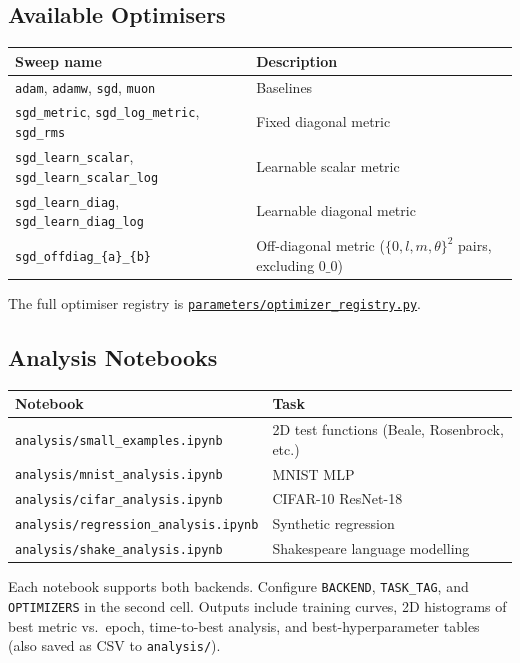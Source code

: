 \documentclass{article}
\begin{document}
\begin{appendices}
\subsection{Available Optimisers}
\begin{center}
\footnotesize
\begin{tabular}{@{}lp{6cm}@{}}
    \toprule
    \textbf{Sweep name} & \textbf{Description} \\
    \midrule
    \texttt{adam}, \texttt{adamw}, \texttt{sgd}, \texttt{muon} & Baselines \\
    \texttt{sgd\_metric}, \texttt{sgd\_log\_metric}, \texttt{sgd\_rms} & Fixed diagonal metric \\
    \texttt{sgd\_learn\_scalar}, \texttt{sgd\_learn\_scalar\_log} & Learnable scalar metric \\
    \texttt{sgd\_learn\_diag}, \texttt{sgd\_learn\_diag\_log} & Learnable diagonal metric \\
    \texttt{sgd\_offdiag\_\{a\}\_\{b\}} & Off-diagonal metric ($\{0,l,m,\theta\}^2$ pairs, excluding $0\_0$) \\
    \bottomrule
\end{tabular}
\end{center}
The full optimiser registry is \href{https://github.com/Noah-Everett/Induced-Metric-Optimiser/blob/main/parameters/optimizer_registry.py}{\texttt{parameters/optimizer\_registry.py}}.

\subsection{Analysis Notebooks}
\begin{center}
\small
\begin{tabular}{@{}lp{6cm}@{}}
    \toprule
    \textbf{Notebook} & \textbf{Task} \\
    \midrule
    \texttt{analysis/small\_examples.ipynb}   & 2D test functions (Beale, Rosenbrock, etc.) \\
    \texttt{analysis/mnist\_analysis.ipynb}   & MNIST MLP \\
    \texttt{analysis/cifar\_analysis.ipynb}   & CIFAR-10 ResNet-18 \\
    \texttt{analysis/regression\_analysis.ipynb} & Synthetic regression \\
    \texttt{analysis/shake\_analysis.ipynb}   & Shakespeare language modelling \\
    \bottomrule
\end{tabular}
\end{center}
Each notebook supports both backends.
Configure \texttt{BACKEND}, \texttt{TASK\_TAG}, and \texttt{OPTIMIZERS} in the second cell.
Outputs include training curves, 2D histograms of best metric vs.\ epoch,
time-to-best analysis, and best-hyperparameter tables (also saved as CSV to \texttt{analysis/}).

\end{appendices}
\end{document}
